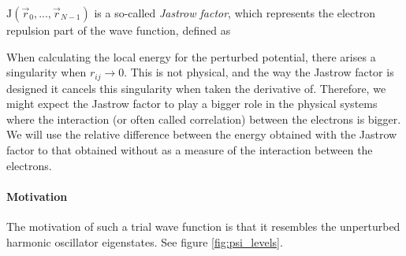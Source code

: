 $\textrm{J} (\vec r_0, ... , \vec r_{N-1} )$ is a so-called \textit{Jastrow factor}, which represents the electron repulsion part of the wave function, defined as

\eqs
{}
\eqf

When calculating the local energy for the perturbed potential, there arises a singularity when $r_{ij} \rightarrow 0$. 
This is not physical, and the way the Jastrow factor is designed it cancels this singularity when taken the derivative of. 
Therefore, we might expect the Jastrow factor to play a bigger role in the physical systems where the interaction (or often called correlation) between the electrons is bigger. 
We will use the relative difference between the energy obtained with the Jastrow factor to that obtained without as a measure of the interaction between the electrons. 















\paragraph{Motivation} \label{sec:motivation}

The motivation of such a trial wave function is that it resembles the unperturbed harmonic oscillator eigenstates. 
See figure \ref{fig:psi_levels}. 

